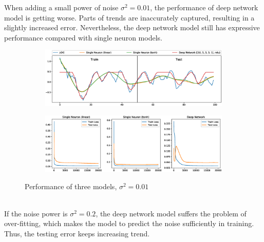 When adding a small power of noise $\sigma^2=0.01$, the performance of deep network model is getting worse. Parts of trends are inaccurately captured, resulting in a slightly increased error. Nevertheless, the deep network model still has expressive performance compared with single neuron models.
\begin{figure}[htb]
     \centering
     \begin{subfigure}[b]{0.6\textwidth}
         \centering
         \includegraphics[width=\textwidth]{fig/4/48a1.eps}
     \end{subfigure}
     \begin{subfigure}[b]{0.7\textwidth}
         \centering
         \includegraphics[width=\textwidth]{fig/4/48a2.eps}
     \end{subfigure}
     \caption{Performance of three models, $\sigma^2=0.01$}
     \label{fig:4_8_a}
\end{figure}\\
If the noise power is $\sigma^2=0.2$, the deep network model suffers the problem of over-fitting, which makes the model to predict the noise  sufficiently in training. Thus, the testing error keeps increasing trend.
